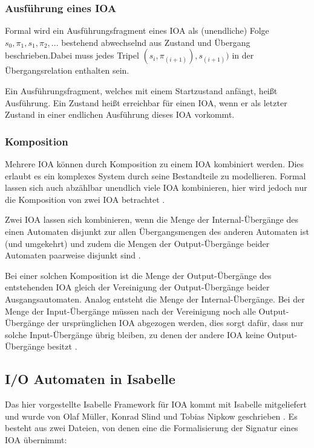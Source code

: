 \documentclass[12pt,a4paper]{tucarticle2019}
\begin{document}
	\subsubsection{Ausführung eines IOA}
	Formal wird ein Ausführungsfragment eines IOA als (unendliche) Folge $s_0, \pi_1, s_1, \pi_2,...$ bestehend abwechselnd aus Zustand und Übergang beschrieben.Dabei muss jedes Tripel $(s_i, \pi_(i+1)), s_(i+1))$ in der Übergangsrelation enthalten sein. 
	
	Ein Ausführungsfragment, welches mit einem Startzustand anfängt, heißt Ausführung. Ein Zustand heißt erreichbar für einen IOA, wenn er als letzter Zustand in einer endlichen Ausführung dieses IOA vorkommt.
	
	\subsubsection{Komposition}
	Mehrere IOA können durch Komposition zu einem IOA kombiniert werden. Dies erlaubt es ein komplexes System durch seine Bestandteile zu modellieren. Formal lassen sich auch abzählbar unendlich viele IOA kombinieren, hier wird jedoch nur die Komposition von zwei IOA betrachtet \cite{lynchbook}.
	
	Zwei IOA lassen sich kombinieren, wenn die Menge der Internal-Übergänge des einen Automaten disjunkt zur allen Übergangsmengen des anderen Automaten ist (und umgekehrt) und zudem die Mengen der Output-Übergänge beider Automaten paarweise disjunkt sind \cite{lynchbook}.
	
	Bei einer solchen Komposition ist die Menge der Output-Übergänge des entstehenden IOA gleich der Vereinigung der Output-Übergänge beider Ausgangsautomaten. Analog entsteht die Menge der Internal-Übergänge. Bei der Menge der Input-Übergänge müssen nach der Vereinigung noch alle Output-Übergänge der ursprünglichen IOA abgezogen werden, dies sorgt dafür, dass nur solche Input-Übergänge übrig bleiben, zu denen der andere IOA keine Output-Übergänge besitzt \cite{lynchbook}.
	
	\subsection{I/O Automaten in Isabelle}
	Das hier vorgestellte Isabelle Framework für IOA kommt mit Isabelle mitgeliefert und wurde von Olaf Müller, Konrad Slind und Tobias Nipkow geschrieben \cite{ioaCode}. Es besteht aus zwei Dateien, von denen eine die Formalisierung der Signatur eines IOA übernimmt: 
	
\end{document}
